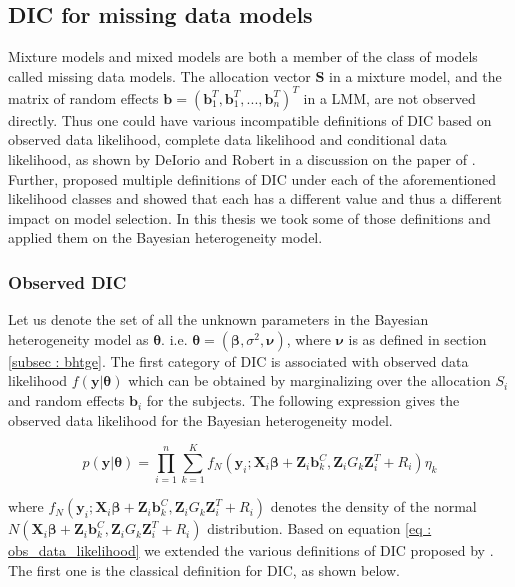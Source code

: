 \subsection{DIC for missing data models}
\label{subsec : DIC_missing_data_models}
Mixture models and mixed models are both a member of the class of models called missing data models. The allocation vector $\boldsymbol{S}$ in a mixture model, and the matrix of random effects $\boldsymbol{b}=(\boldsymbol{b}_1^T, \boldsymbol{b}_1^T, ..., \boldsymbol{b}_n^T)^T$ in a LMM, are not observed directly. Thus one could have various incompatible definitions of DIC based on observed data likelihood, complete data likelihood and conditional data likelihood, as shown by DeIorio and Robert in a discussion on the paper of \citet{spiegelhalter_bayesian_2002}. Further, \citet{celeux_deviance_2006} proposed multiple definitions of DIC under each of the aforementioned likelihood classes and showed that each has a different value and thus a different impact on model selection. In this thesis we took some of those definitions and applied them on the Bayesian heterogeneity model. 

\subsubsection{Observed DIC}
Let us denote the set of all the unknown parameters in the Bayesian heterogeneity model as $\boldsymbol{\theta}$. i.e. $\boldsymbol{\theta} = (\boldsymbol{\beta}, \sigma^2, \boldsymbol{\nu})$, where $\boldsymbol{\nu}$ is as defined in section \ref{subsec : bhtge}. The first category of DIC is associated with observed data likelihood $f(\boldsymbol{y}|\boldsymbol{\theta})$ which can be obtained by marginalizing over the allocation $S_i$ and random effects $\boldsymbol{b}_i$ for the subjects. The following expression gives the observed data likelihood for the Bayesian heterogeneity model.

\begin{equation}
\label{eq : obs_data_likelihood}
p(\boldsymbol{y}|\boldsymbol{\theta}) = \prod_{i=1}^n \sum_{k=1}^K f_N(\boldsymbol{y}_i; \boldsymbol{X}_i\boldsymbol{\beta} + \boldsymbol{Z}_i \boldsymbol{b}_k^C, \boldsymbol{Z}_{i} G_k \boldsymbol{Z}_{i}^T+ R_i) \eta_k
\end{equation}
 
where $f_N(\boldsymbol{y}_i; \boldsymbol{X}_i\boldsymbol{\beta} + \boldsymbol{Z}_i \boldsymbol{b}_k^C, \boldsymbol{Z}_{i} G_k \boldsymbol{Z}_{i}^T+ R_i)$ denotes the density of the normal $N(\boldsymbol{X}_i\boldsymbol{\beta} + \boldsymbol{Z}_i \boldsymbol{b}_k^C, \boldsymbol{Z}_{i} G_k \boldsymbol{Z}_{i}^T+ R_i)$ distribution. Based on equation \ref{eq : obs_data_likelihood} we extended the various definitions of DIC proposed by \citet{celeux_deviance_2006}. The first one is the classical definition for DIC, as shown below.

